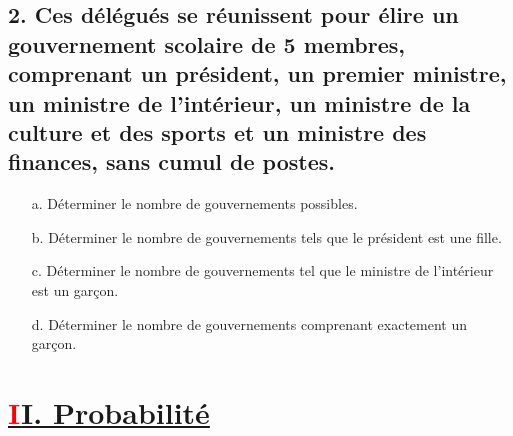 \documentclass[12pt]{article}
\begin{document}
\subsection*{2. Ces délégués se réunissent pour élire un gouvernement scolaire de 5 membres, comprenant un président, un premier ministre, un ministre de l’intérieur, un ministre de la culture et des sports et un ministre des finances, sans cumul de postes.}
\begin{enumerate}
    \item[a.] Déterminer le nombre de gouvernements possibles. \\
    
    \item[b.] Déterminer le nombre de gouvernements tels que le président est une fille. \\
    
    \item[c.] Déterminer le nombre de gouvernements tel que le ministre de l’intérieur est un garçon. \\
    
    \item[d.] Déterminer le nombre de gouvernements comprenant exactement un garçon. \\
\end{enumerate}
\section*{\underline{\textbf{\textcolor{red}II. Probabilité}}}
\end{document}
